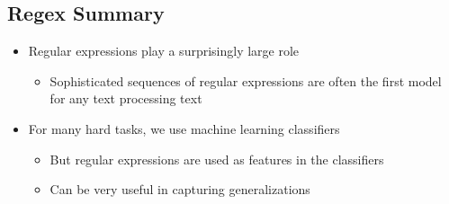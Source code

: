 \documentclass[11pt]{article}
\theoremstyle{definition}
\begin{document}
\subsection{Regex Summary}
\begin{itemize}
  \item Regular expressions play a surprisingly large role
  \begin{itemize}
    \item Sophisticated sequences of regular expressions are often the first model
    for any text processing text
  \end{itemize}
\end{itemize}
\begin{itemize}
  \item For many hard tasks, we use machine learning classifiers
  \begin{itemize}
    \item But regular expressions are used as features in the classifiers
    \item Can be very useful in capturing generalizations
  \end{itemize}
\end{itemize}
\end{document}
